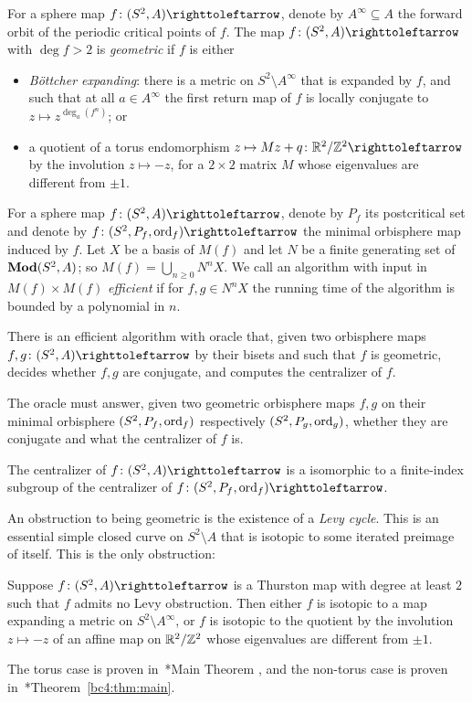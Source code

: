 \documentclass{amsart}
\begin{document}
For a sphere map $f\colon (S^2,A)\selfmap$, denote by
$A^\infty\subseteq A$ the forward orbit of the periodic critical
points of $f$. The map $f\colon (S^2,A)\selfmap $ with $\deg f>2$ is
\emph{geometric} if $f$ is either
\begin{itemize}
\item[\Exp] \emph{B\"ottcher expanding}: there is a metric on
  $S^2\setminus A^\infty$ that is expanded by $f$, and such that at
  all $a\in A^\infty$ the first return map of $f$ is locally conjugate
  to $z\mapsto z^{\deg_a(f^n)}$; or
\item[\Tor] a quotient of a torus endomorphism
  $z\mapsto M z+q\colon\R^2/\Z^2\selfmap$ by the involution
  $z\mapsto-z$, for a $2\times2$ matrix $M$ whose eigenvalues are
  different from $\pm 1$.
\end{itemize}

For a sphere map $f\colon (S^2,A)\selfmap$, denote by $P_f$ its
postcritical set and denote by $f\colon (S^2,P_f,\ord_f)\selfmap $ the
minimal orbisphere map induced by $f$.  Let $X$ be a basis of $M(f)$
and let $N$ be a finite generating set of $\mathbf{\relax Mod}(S^2,A)$; so
$M(f)=\bigcup_{n\ge0} N^n X$. We call an algorithm with input in
$M(f)\times M(f)$ \emph{efficient} if for $f,g\in N^n X$ the running
time of the algorithm is bounded by a polynomial in $n$.

\begin{thm}
\label{thm:removing extra marked pnts}
 There is an efficient algorithm with oracle that, given two
  orbisphere maps $f,g\colon (S^2,A)\selfmap$ by their bisets and such that $f$ is
  geometric, decides whether $f,g$ are conjugate, and computes the
  centralizer of $f$.

  The oracle must answer, given two geometric orbisphere maps $f,g$ on
  their minimal orbisphere $(S^2,P_f,\operatorname{ord}_f)$ respectively
  $(S^2,P_g,\operatorname{ord}_g)$, whether they are conjugate and what the
  centralizer of $f$ is.
  
  The centralizer of $f\colon (S^2,A)\selfmap$ is a isomorphic to a finite-index subgroup of the centralizer of  $f\colon (S^2,P_f,\ord_f)\selfmap$. 
\end{thm}

An obstruction to being geometric is the existence of a
\emph{Levy cycle}. This is an essential simple closed curve on
$S^2\setminus A$ that is isotopic to some iterated preimage of
itself. This is the only obstruction:
\begin{thm}
  Suppose $f\colon (S^2,A)\selfmap $ is a Thurston map with degree at
  least $2$ such that $f$ admits no Levy obstruction. Then either $f$
  is isotopic to a map expanding a metric on $S^2\setminus A^\infty$, or $f$
  is isotopic to the quotient by the involution $z\mapsto -z$ of an
  affine map on ${\mathbb R}^2/{\mathbb Z}^2$ whose eigenvalues are different from
  $\pm1$.
\end{thm} 
\noindent The torus case is proven
in~\cite{selinger-yampolsky:geometrization}*{Main Theorem
  \MakeUppercase{}}, and the non-torus case is proven
in~\cite{bartholdi-dudko:bc4}*{Theorem~\ref{bc4:thm:main}}.
\end{document}
